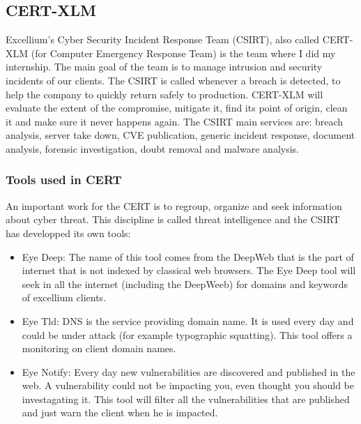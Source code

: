 \documentclass{tnreport}
\begin{document}
\subsection{\gls{CERT}-XLM}\label{certxml}
\gls{Excellium}'s Cyber Security Incident Response Team (\gls{CSIRT}), also called \gls{CERT}-XLM (for Computer Emergency Response Team) is the team where I did my internship. The main goal of the team is to manage intrusion and security incidents of our clients. The \gls{CSIRT} is called whenever a breach is detected, to help the company to quickly return safely to production. \gls{CERT}-XLM will evaluate the extent of the compromise, mitigate it, find its point of origin, clean it and make sure it never happens again. The \gls{CSIRT} main services are: breach analysis, server take down, \gls{CVE} publication, generic incident response, document analysis, forensic investigation, doubt removal and malware analysis.

\subsubsection{Tools used in CERT}
An important work for the CERT is to regroup, organize and seek information about cyber threat. This discipline is called threat intelligence and the CSIRT has developped its own tools:
\begin{itemize}
    \item Eye Deep: The name of this tool comes from the DeepWeb that is the part of internet that is not indexed by classical web browsers. The Eye Deep tool will seek in all the internet (including the DeepWeeb) for domains and keywords of excellium clients.
    \item Eye Tld: DNS is the service providing domain name. It is used every day and could be under attack (for example typographic squatting). This tool offers a monitoring on client domain names.
    \item Eye Notify: Every day new vulnerabilities are discovered and published in the web. A vulnerability could not be impacting you, even thought you should be investagating it. This tool will filter all the vulnerabilities that are published and just warn the client when he is impacted. 
\end{itemize}
\end{document}

